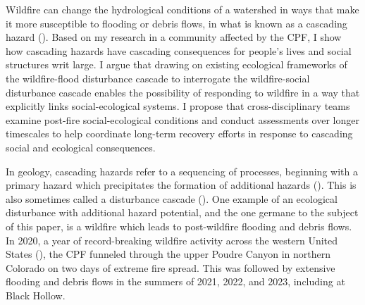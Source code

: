 \documentclass[
]{article}
\begin{document}
Wildfire can change the hydrological conditions of a watershed in ways that make it more susceptible to flooding or debris flows, in what is known as a cascading hazard (). Based on my research in a community affected by the CPF, I show how cascading hazards have cascading consequences for people's lives and social structures writ large. I argue that drawing on existing ecological frameworks of the wildfire-flood disturbance cascade to interrogate the wildfire-social disturbance cascade enables the possibility of responding to wildfire in a way that explicitly links social-ecological systems. I propose that cross-disciplinary teams examine post-fire social-ecological conditions and conduct assessments over longer timescales to help coordinate long-term recovery efforts in response to cascading social and ecological consequences.

In geology, cascading hazards refer to a sequencing of processes, beginning with a primary hazard which precipitates the formation of additional hazards (). This is also sometimes called a disturbance cascade (). One example of an ecological disturbance with additional hazard potential, and the one germane to the subject of this paper, is a wildfire which leads to post-wildfire flooding and debris flows. In 2020, a year of record-breaking wildfire activity across the western United States (), the CPF funneled through the upper Poudre Canyon in northern Colorado on two days of extreme fire spread. This was followed by extensive flooding and debris flows in the summers of 2021, 2022, and 2023, including at Black Hollow.
\end{document}
